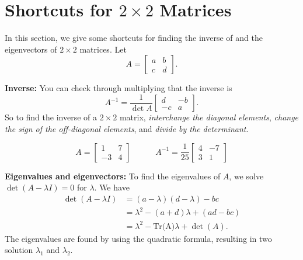%
%
\section{Shortcuts for $2\times 2$ Matrices}
In this section, we give
some shortcuts for finding the inverse of and the eigenvectors of $2\times 2$ matrices.
%
Let
\[
   A = \begin{bmatrix}
              a & b \\ c & d
       \end{bmatrix}.
\]

\noindent
\textbf{Inverse:}
You can check through multiplying that the inverse is
\[
   A^{-1} = \frac{1}{\det A}\begin{bmatrix}
                               d & -b \\ -c & a
                            \end{bmatrix}.
\]
So to find the inverse of a $2 \times 2$ matrix,
\emph{interchange the diagonal elements}, \emph{change the sign of the off-diagonal elements}, and
\emph{divide by the determinant}.

\begin{xexample}
\[
  A = \begin{bmatrix}
          1 & 7 \\ -3 & 4
      \end{bmatrix}
  \quad\quad\quad
  A^{-1} = \frac{1}{25}\begin{bmatrix}
                          4 & -7 \\ 3 & 1
                       \end{bmatrix}
\]
\end{xexample}

\noindent
{\bf Eigenvalues and eigenvectors:}
To find the eigenvalues of $A$, we solve
$\det(A-\lambda I)=0$ for $\lambda$.
We have
\[
\begin{split}
   \det(A-\lambda I) & = (a-\lambda)(d-\lambda)-bc \\
                     & = \lambda^2-(a+d)\lambda + (ad-bc) \\
		     & = \lambda^2 - \textrm{Tr(A)}\lambda + \det(A).
\end{split}
\]
The eigenvalues are found by using the quadratic
formula, resulting in two solution $\lambda_1$ and $\lambda_2$.

